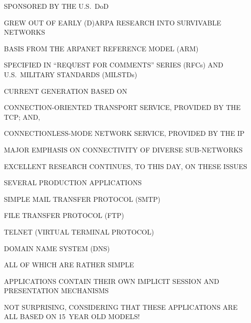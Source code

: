 \begin{bwslide}

\begin{nrtc}
\item	SPONSORED BY THE U.S.~DoD
    \begin{nrtc}
    \item	GREW OUT OF EARLY (D)ARPA RESEARCH INTO SURVIVABLE NETWORKS
    \end{nrtc}
    BASIS FROM THE ARPANET REFERENCE MODEL (ARM)

\item	SPECIFIED IN ``REQUEST FOR COMMENTS'' SERIES (RFCs) AND
	U.S.~MILITARY STANDARDS (MILSTDs)

\item	CURRENT GENERATION BASED ON
    \begin{nrtc}
    \item	CONNECTION-ORIENTED TRANSPORT SERVICE,
		PROVIDED BY THE TCP; AND,

    \item	CONNECTIONLESS-MODE NETWORK SERVICE,
		PROVIDED BY THE IP
    \end{nrtc}

\item	MAJOR EMPHASIS ON CONNECTIVITY OF DIVERSE SUB-NETWORKS
    \begin{nrtc}
    \item	EXCELLENT RESEARCH CONTINUES, TO THIS DAY, ON THESE ISSUES
    \end{nrtc}
\end{nrtc}
\end{bwslide}


\begin{bwslide}

\begin{nrtc}
\item	SEVERAL PRODUCTION APPLICATIONS
    \begin{nrtc}
    \item	SIMPLE MAIL TRANSFER PROTOCOL (SMTP)

    \item	FILE TRANSFER PROTOCOL (FTP)

    \item	TELNET (VIRTUAL TERMINAL PROTOCOL)

    \item	DOMAIN NAME SYSTEM (DNS)
    \end{nrtc}
    ALL OF WHICH ARE RATHER SIMPLE

\item	APPLICATIONS CONTAIN THEIR OWN IMPLICIT SESSION AND PRESENTATION
	MECHANISMS

\item	NOT SURPRISING, CONSIDERING THAT THESE APPLICATIONS ARE ALL BASED ON
	15~YEAR OLD MODELS!
\end{nrtc}
\end{bwslide}


